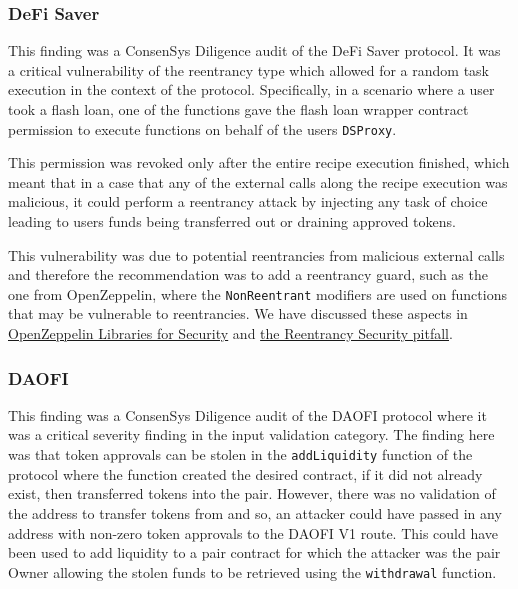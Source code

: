 \subsubsection{DeFi Saver}\label{defi-saver}

This finding was a ConsenSys Diligence audit of the DeFi Saver protocol.
It was a critical vulnerability of the reentrancy type which allowed for
a random task execution in the context of the protocol. Specifically, in
a scenario where a user took a flash loan, one of the functions gave the
flash loan wrapper contract permission to execute functions on behalf of
the users \texttt{DSProxy}.

This permission was revoked only after the entire recipe execution
finished, which meant that in a case that any of the external calls
along the recipe execution was malicious, it could perform a reentrancy
attack by injecting any task of choice leading to users funds being
transferred out or draining approved tokens.

This vulnerability was due to potential reentrancies from malicious
external calls and therefore the recommendation was to add a reentrancy
guard, such as the one from OpenZeppelin, where the
\texttt{NonReentrant} modifiers are used on functions that may be
vulnerable to reentrancies. We have discussed these aspects in
\href{../2.Solidity/2.28_Open_Zeppelin_Libraries.md\#ReentrancyGuard}{OpenZeppelin
Libraries for Security} and
\href{../3.Security_Pitfalls_and_Best_Practices/3.6_Reentrancy.md}{the
Reentrancy Security pitfall}.

\subsubsection{DAOFI}\label{daofi}

This finding was a ConsenSys Diligence audit of the DAOFI protocol where
it was a critical severity finding in the input validation category. The
finding here was that token approvals can be stolen in the
\texttt{addLiquidity} function of the protocol where the function
created the desired contract, if it did not already exist, then
transferred tokens into the pair. However, there was no validation of
the address to transfer tokens from and so, an attacker could have
passed in any address with non-zero token approvals to the DAOFI V1
route. This could have been used to add liquidity to a pair contract for
which the attacker was the pair Owner allowing the stolen funds to be
retrieved using the \texttt{withdrawal} function.

